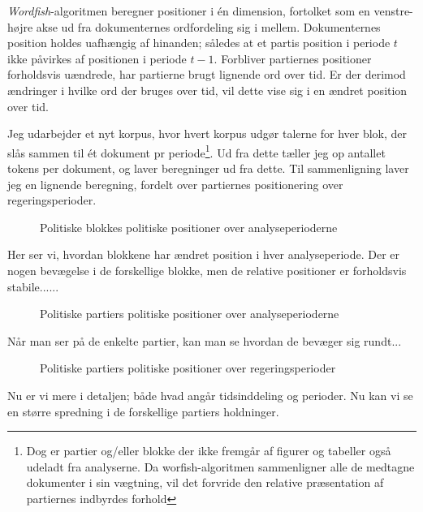 \textit{Wordfish}-algoritmen beregner positioner i én dimension, fortolket som en venstre-højre akse ud fra dokumenternes ordfordeling sig i mellem.
Dokumenternes position holdes uafhængig af hinanden; således at et partis position i periode $t$ ikke påvirkes af positionen i periode $t-1$.
Forbliver partiernes positioner forholdsvis uændrede, har partierne brugt lignende ord over tid.
Er der derimod ændringer i hvilke ord der bruges over tid, vil dette vise sig i en ændret position over tid.

Jeg udarbejder et nyt korpus, hvor hvert korpus udgør talerne for hver blok, der slås sammen til ét dokument pr periode\footnote{Dog er partier og/eller blokke der ikke fremgår af figurer og tabeller også udeladt fra analyserne. Da worfish-algoritmen sammenligner alle de medtagne dokumenter i sin vægtning, vil det forvride den relative præsentation af partiernes indbyrdes forhold}.
Ud fra dette tæller jeg op antallet tokens per dokument, og laver beregninger ud fra dette.
Til sammenligning laver jeg en lignende beregning, fordelt over partiernes positionering over regeringsperioder.

\begin{figure}
  
\caption{Politiske blokkes politiske positioner over analyseperioderne}
\label{fig:fish_blocXperiod}
\end{figure}Her ser vi, hvordan blokkene har ændret position i hver analyseperiode.
Der er nogen bevægelse i de forskellige blokke, men de relative positioner er forholdsvis stabile......

\begin{figure}
  
\caption{Politiske partiers politiske positioner over analyseperioderne}
\label{fig:fish_partyXperiod}
\end{figure}

Når man ser på de enkelte partier, kan man se hvordan de bevæger sig rundt...

\begin{figure}
\begin{adjustwidth}{-8em}{-8em}
  
\end{adjustwidth}
\caption{Politiske partiers politiske positioner over regeringsperioder}
\label{fig:fish_partyXgovt}
\end{figure}
Nu er vi mere i detaljen; både hvad angår tidsinddeling og perioder. Nu kan vi se en større spredning i de forskellige partiers holdninger.


